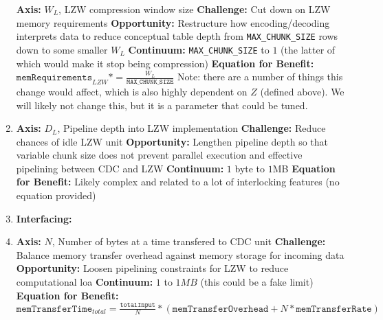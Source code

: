 \documentclass{article}
\begin{document}
\begin{enumerate}
\textbf{Axis:} $W_L$, LZW compression window size
\newline
\textbf{Challenge:} Cut down on LZW memory requirements
\newline
\textbf{Opportunity:} Restructure how encoding/decoding interprets data to reduce conceptual table depth from \texttt{MAX\_CHUNK\_SIZE} rows down to some smaller $W_L$
\newline
\textbf{Continuum:} \texttt{MAX\_CHUNK\_SIZE} to $1$ (the latter of which would make it stop being compression)
\newline
\textbf{Equation for Benefit:} $\texttt{memRequirements}_{LZW} *= \frac{W_L}{\texttt{MAX\_CHUNK\_SIZE}}$\newline
Note: there are a number of things this change would affect, which is also highly dependent on $Z$ (defined above). We will likely not change this, but it is a parameter that could be tuned.

\item%

\textbf{Axis:} $D_L$, Pipeline depth into LZW implementation
\newline
\textbf{Challenge:} Reduce chances of idle LZW unit
\newline
\textbf{Opportunity:} Lengthen pipeline depth so that variable chunk size does not prevent parallel execution and effective pipelining between CDC and LZW
\newline
\textbf{Continuum:} $1$ byte to $1$MB
\newline
\textbf{Equation for Benefit:} Likely complex and related to a lot of interlocking features (no equation provided)

\item%


\textbf{Interfacing:}
\item%

\textbf{Axis:} $N$, Number of bytes at a time transfered to CDC unit
\newline
\textbf{Challenge:} Balance memory transfer overhead against memory storage for incoming data
\newline
\textbf{Opportunity:} Loosen pipelining constraints for LZW to reduce computational loa
\newline
\textbf{Continuum:} $1$ to $1MB$ (this could be a fake limit)
\newline
\textbf{Equation for Benefit:} $\texttt{memTransferTime}_{total} = \frac{\texttt{totalInput}}{N}*\left(\texttt{memTransferOverhead} + N*\texttt{memTransferRate}    \right)$


\end{enumerate}
\end{document}
